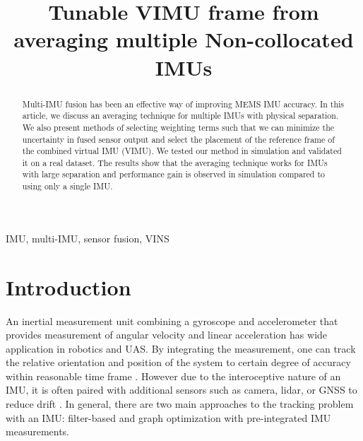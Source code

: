 \documentclass[conference]{IEEEtran}
\begin{document}
\title{Tunable VIMU frame from averaging multiple Non-collocated IMUs}

\author{
\and
{}
}

\maketitle

\begin{abstract}
Multi-IMU fusion has been an effective way of improving MEMS IMU accuracy. In this article, we discuss an averaging technique for multiple IMUs with physical separation. We also present methods of selecting weighting terms such that we can minimize the uncertainty in fused sensor output and select the placement of the reference frame of the combined virtual IMU (VIMU). We tested our method in simulation and validated it on a real dataset. The results show that the averaging technique works for IMUs with large separation and performance gain is observed in simulation compared to using only a single IMU.
\end{abstract}

\begin{IEEEkeywords}
IMU, multi-IMU, sensor fusion, VINS
\end{IEEEkeywords}

\section{Introduction}

An inertial measurement unit combining a gyroscope and accelerometer that provides measurement of angular velocity and linear acceleration has wide application in robotics and UAS. By integrating the measurement, one can track the relative orientation and position of the system to certain degree of accuracy within reasonable time frame \cite{tang2022_preintegration}. However due to the interoceptive nature of an IMU, it is often paired with additional sensors such as camera, lidar, or GNSS to reduce drift \cite{alaba2024_gps_and_imu, shan2020_liosam, he2020_visual_imu_and_gps}. In general, there are two main approaches to the tracking problem with an IMU: filter-based and graph optimization with pre-integrated IMU measurements.
\end{document}
